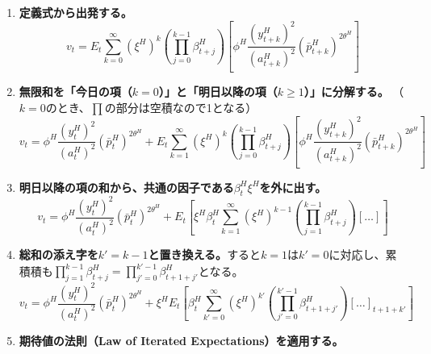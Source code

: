 \begin{enumerate}
    \item\label{itm:appendix_optimal_price_derivation_foc_sub4_v_step1} \textbf{定義式から出発する。}
    \begin{equation}
    v_t=E_t\sum_{k=0}^{\infty}(\xi^H)^k\left(\prod_{j=0}^{k-1}\beta_{t+j}^H\right)\left[\phi^H\frac{(y_{t+k}^H)^2}{(a_{t+k}^H)^2}(\bar{p}_{t+k}^H)^{2\theta^H}\right]
    \label{eq:appendix_optimal_price_derivation_foc_sub4_v_def}
    \end{equation}
    \item\label{itm:appendix_optimal_price_derivation_foc_sub4_v_step2} \textbf{無限和を「今日の項（\(k=0\)）」と「明日以降の項（\(k\ge1\)）」に分解する。}
    （\(k=0\)のとき、\(\prod\)の部分は空積なので1となる）
    \begin{equation}
    v_t=\phi^H\frac{(y_t^H)^2}{(a_t^H)^2}(\bar{p}_t^H)^{2\theta^H}+E_t\sum_{k=1}^{\infty}(\xi^H)^k\left(\prod_{j=0}^{k-1}\beta_{t+j}^H\right)\left[\phi^H\frac{(y_{t+k}^H)^2}{(a_{t+k}^H)^2}(\bar{p}_{t+k}^H)^{2\theta^H}\right]
    \label{eq:appendix_optimal_price_derivation_foc_sub4_v_decomp}
    \end{equation}
    \item\label{itm:appendix_optimal_price_derivation_foc_sub4_v_step3} \textbf{明日以降の項の和から、共通の因子である\(\beta_t^H\xi^H\)を外に出す。}
    \begin{equation}
    v_t=\phi^H\frac{(y_t^H)^2}{(a_t^H)^2}(\bar{p}_t^H)^{2\theta^H}+E_t\left[\xi^H\beta_t^H\sum_{k=1}^{\infty}(\xi^H)^{k-1}\left(\prod_{j=1}^{k-1}\beta_{t+j}^H\right)\left[\dots\right]\right]
    \label{eq:appendix_optimal_price_derivation_foc_sub4_v_factoring}
    \end{equation}
    \item\label{itm:appendix_optimal_price_derivation_foc_sub4_v_step4} \textbf{総和の添え字を\(k'=k-1\)と置き換える。}すると\(k=1\)は\(k'=0\)に対応し、累積積も\(\prod_{j=1}^{k-1}\beta_{t+j}^H=\prod_{j'=0}^{k'-1}\beta_{t+1+j'}^H\)となる。
    \begin{equation}
    v_t=\phi^H\frac{(y_t^H)^2}{(a_t^H)^2}(\bar{p}_t^H)^{2\theta^H}+\xi^HE_t\left[\beta_t^H\sum_{k'=0}^{\infty}(\xi^H)^{k'}\left(\prod_{j'=0}^{k'-1}\beta_{t+1+j'}^H\right)\left[\dots\right]_{t+1+k'}\right]
    \label{eq:appendix_optimal_price_derivation_foc_sub4_v_index_shift}
    \end{equation}
    \item\label{itm:appendix_optimal_price_derivation_foc_sub4_v_step5} \textbf{期待値の法則（Law of Iterated Expectations）を適用する。}

\end{enumerate}
